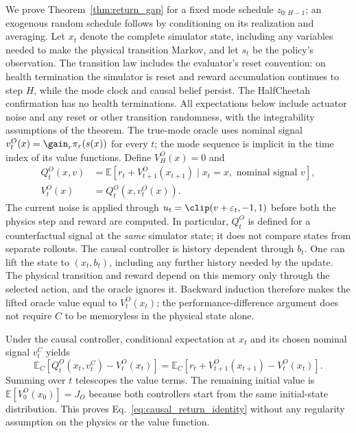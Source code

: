 We prove Theorem~\ref{thm:return_gap} for a fixed mode schedule $z_{0:H-1}$; an exogenous random schedule follows by conditioning on its realization and averaging. Let $x_t$ denote the complete simulator state, including any variables needed to make the physical transition Markov, and let $s_t$ be the policy's observation. The transition law includes the evaluator's reset convention: on health termination the simulator is reset and reward accumulation continues to step $H$, while the mode clock and causal belief persist. The HalfCheetah confirmation has no health terminations. All expectations below include actuator noise and any reset or other transition randomness, with the integrability assumptions of the theorem. The true-mode oracle uses nominal signal $v_t^O(x)=\gain_r\pi_r(s(x))$ for every $t$; the mode sequence is implicit in the time index of its value functions. Define $V_H^O(x)=0$ and
\begin{align}
 Q_t^O(x,v)&=\mathbb E\!\left[r_t+V_{t+1}^O(x_{t+1})
 \mid x_t=x,\text{ nominal signal }v\right],\\
 V_t^O(x)&=Q_t^O(x,v_t^O(x)).
\end{align}
The current noise is applied through $u_t=\clip(v+\varepsilon_t,-1,1)$ before both the physics step and reward are computed. In particular, $Q_t^O$ is defined for a counterfactual signal at the \emph{same} simulator state; it does not compare states from separate rollouts. The causal controller is history dependent through $b_t$. One can lift the state to $(x_t,b_t)$, including any further history needed by the update. The physical transition and reward depend on this memory only through the selected action, and the oracle ignores it. Backward induction therefore makes the lifted oracle value equal to $V_t^O(x_t)$; the performance-difference argument does not require $C$ to be memoryless in the physical state alone.

Under the causal controller, conditional expectation at $x_t$ and its chosen nominal signal $v_t^C$ yields
\begin{equation}
 \mathbb E_C\!\left[Q_t^O(x_t,v_t^C)-V_t^O(x_t)\right]
 =\mathbb E_C\!\left[r_t+V_{t+1}^O(x_{t+1})-V_t^O(x_t)\right].
\end{equation}
Summing over $t$ telescopes the value terms. The remaining initial value is $\mathbb E[V_0^O(x_0)]=J_O$ because both controllers start from the same initial-state distribution. This proves Eq.~\eqref{eq:causal_return_identity} without any regularity assumption on the physics or the value function.

